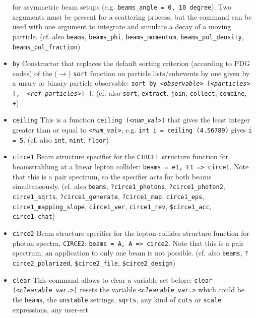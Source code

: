 \documentclass[12pt]{book}
\newcommand{\ttt}[1]{\texttt{#1}}
\newcommand{\circeone}{\ttt{CIRCE1}}
\newcommand{\circetwo}{\ttt{CIRCE2}}
\begin{document}
\begin{itemize}
for asymmetric beam setups (e.g. \ttt{beams\_angle = 0, 10
degree}). Two arguments must be present for a scattering process, but
the command can be used with one argument to integrate and simulate a
decay of a moving particle. (cf. also \ttt{beams}, \ttt{beams\_phi},
\ttt{beams\_momentum}, \ttt{beams\_pol\_density},
\ttt{beams\_pol\_fraction})
\item
\ttt{by} \newline
Constructor that replaces the default sorting criterion (according to
PDG codes) of the ($\to$) \ttt{sort} function on particle
lists/subevents by one given by a unary or binary particle observable:
\ttt{sort by {\em <observable>} [{\em <particles>} [, {\em
<ref\_particles>}] ]}. (cf. also \ttt{sort}, \ttt{extract}, \ttt{join},
\ttt{collect}, \ttt{combine}, \ttt{+})
\item
\ttt{ceiling} \newline
This is a function \ttt{ceiling ({\em <num\_val>})} that gives the
least integer greater than or equal to \ttt{{\em <num\_val>}},
e.g. \ttt{int i = ceiling (4.56789)} gives \ttt{i = 5}. (cf. also
\ttt{int}, \ttt{nint}, \ttt{floor})
\item
\ttt{circe1} \newline
Beam structure specifier for the \circeone\ structure function for
beamstrahlung at a linear lepton collider: \ttt{beams = e1, E1 =>
circe1}. Note that this is a pair spectrum, so the specifier acts for
both beams simultaneously. (cf. also \ttt{beams}, \ttt{?circe1\_photons},
\ttt{?circe1\_photon2}, \ttt{circe1\_sqrts},
\ttt{?circe1\_generate}, \ttt{?circe1\_map},
\ttt{circe1\_eps}, \newline \ttt{circe1\_mapping\_slope}, \ttt{circe1\_ver},
\ttt{circe1\_rev}, \ttt{\$circe1\_acc}, \ttt{circe1\_chat})
\item
\ttt{circe2} \newline
Beam structure specifier for the lepton-collider structure function
for photon spectra, \circetwo: \ttt{beams = A, A => circe2}. Note that
this is a pair spectrum, an application to only one beam is not
possible. (cf. also \ttt{beams}, \ttt{?circe2\_polarized},
\ttt{\$circe2\_file}, \ttt{\$circe2\_design})
\item
\ttt{clear} \newline
This command allows to clear a variable set before: \ttt{clear
({\em <clearable var.>})} resets the variable \ttt{{\em <clearable var.>}} which
could be the \ttt{beams}, the \ttt{unstable} settings, \ttt{sqrts},
any kind of \ttt{cuts} or \ttt{scale} expressions, any user-set

\end{itemize}
\end{document}

